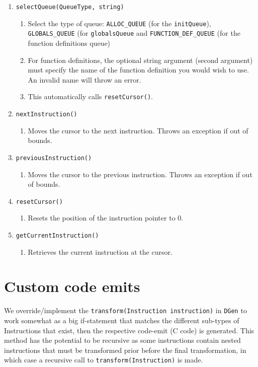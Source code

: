 \begin{enumerate}
\item \texttt{selectQueue(QueueType, string)}
\begin{enumerate}
\item Select the type of queue: \texttt{ALLOC\_QUEUE} (for the \texttt{initQueue}),
\texttt{GLOBALS\_QUEUE} (for \texttt{globalsQueue} and \texttt{FUNCTION\_DEF\_QUEUE}
(for the function definitions queue)
\item For function definitions, the optional string argument (second argument)
must specify the name of the function definition you would wish to
use. An invalid name will throw an error.
\item This automatically calls \texttt{resetCursor()}.
\end{enumerate}
\item \texttt{nextInstruction()}
\begin{enumerate}
\item Moves the cursor to the next instruction. Throws an exception if out
of bounds.
\end{enumerate}
\item \texttt{previousInstruction()}
\begin{enumerate}
\item Moves the cursor to the previous instruction. Throws an exception
if out of bounds.
\end{enumerate}
\item \texttt{resetCursor()}
\begin{enumerate}
\item Resets the position of the instruction pointer to 0.
\end{enumerate}
\item \texttt{getCurrentInstruction()}
\begin{enumerate}
\item Retrieves the current instruction at the cursor.
\end{enumerate}
\end{enumerate}

\section{Custom code emits}

We override/implement the \texttt{transform(Instruction instruction)}
in \texttt{DGen} to work somewhat as a big if-statement that matches
the different sub-types of Instructions that exist, then the respective
code-emit (C code) is generated. This method has the potential to
be recursive as some instructions contain nested instructions that
must be transformed prior before the final transformation, in which
case a recursive call to \texttt{transform(Instruction)} is made.

